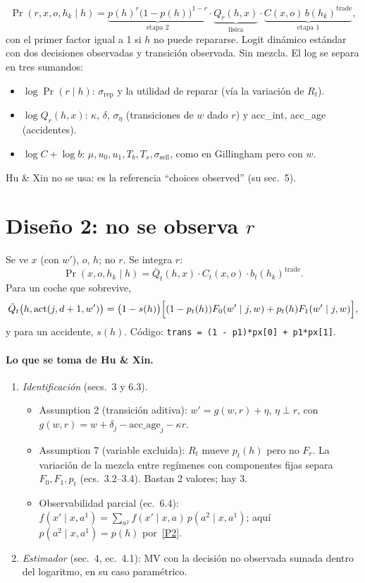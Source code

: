 \documentclass[11pt]{article}
\newcommand{\code}[1]{\texttt{\small #1}}
\newcommand{\act}{\mathrm{act}}
\newcommand{\buy}{b}
\newcommand{\1}{\mathbf{1}}
\newcommand{\Qbar}{\bar Q}
\begin{document}
\[
  \Pr(r,x,o,h_k\mid h)=\underbrace{p(h)^r\bigl(1-p(h)\bigr)^{1-r}}_{\text{etapa 2}}
  \cdot \underbrace{Q_r(h,x)}_{\text{física}}\cdot \underbrace{C(x,o)\,\buy(h_k)^{\text{trade}}}_{\text{etapa 1}},
\]
con el primer factor igual a 1 si $h$ no puede repararse. Logit dinámico estándar con dos
decisiones observadas y transición observada. Sin mezcla. El log se separa en tres sumandos:
\begin{itemize}
  \item $\log\Pr(r\mid h)$: $\sigma_{\text{rep}}$ y la utilidad de reparar (vía la variación
  de $R_t$).
  \item $\log Q_r(h,x)$: $\kappa$, $\delta$, $\sigma_\eta$ (transiciones de $w$ dado $r$) y
  acc\_int, acc\_age (accidentes).
  \item $\log C+\log \buy$: $\mu,u_0,u_1,T_b,T_s,\sigma_{\text{sell}}$, como en Gillingham
  pero con $w$.
\end{itemize}
Hu \& Xin no se usa: es la referencia ``choices observed'' (su sec.~5).

\section{Diseño 2: no se observa $r$}

Se ve $x$ (con $w'$), $o$, $h$; no $r$. Se integra $r$:
\begin{equation}\label{eq:d2}
  \Pr(x,o,h_k\mid h)=\Qbar_t(h,x)\cdot C_t(x,o)\cdot\buy_t(h_k)^{\text{trade}}.
\end{equation}
Para un coche que sobrevive,
\[
  \Qbar_t\bigl(h,\act(j,d+1,w')\bigr)=\bigl(1-s(h)\bigr)\Bigl[(1-p_t(h))F_0(w'\mid j,w)+p_t(h)F_1(w'\mid j,w)\Bigr],
\]
y para un accidente, $s(h)$. Código: \code{trans = (1 - p1)*px[0] + p1*px[1]}.

\paragraph{Lo que se toma de Hu \& Xin.}
\begin{enumerate}
  \item \emph{Identificación} (secs.~3 y 6.3).
  \begin{itemize}
    \item Assumption 2 (transición aditiva): $w'=g(w,r)+\eta$, $\eta\perp r$, con
    $g(w,r)=w+\delta_j-\text{acc\_age}_j-\kappa r$.
    \item Assumption 7 (variable excluida): $R_t$ mueve $p_t(h)$ pero no $F_r$. La variación
    de la mezcla entre regímenes con componentes fijas separa $F_0,F_1,p_t$ (ecs.~3.2--3.4).
    Bastan 2 valores; hay 3.
    \item Observabilidad parcial (ec.~6.4): $f(x'\mid x,a^1)=\sum_{a^2}f(x'\mid x,a)\,
    p(a^2\mid x,a^1)$; aquí $p(a^2\mid x,a^1)=p(h)$ por~\ref{P2}.
  \end{itemize}
  \item \emph{Estimador} (sec.~4, ec.~4.1): MV con la decisión no observada sumada dentro
  del logaritmo, en su caso paramétrico.
\end{enumerate}
\end{document}
